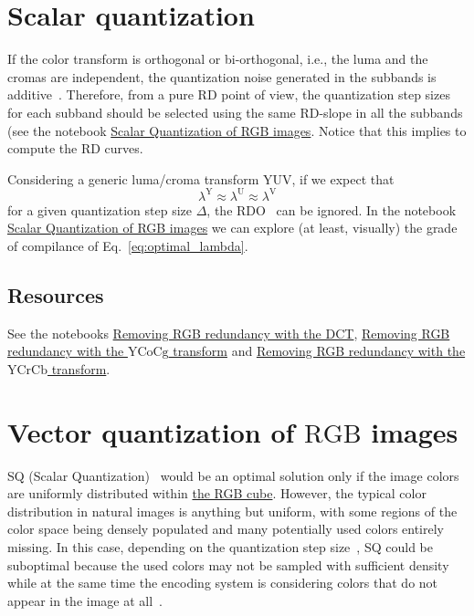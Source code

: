 \section{Scalar quantization}

If the color transform is orthogonal or bi-orthogonal, i.e., the luma
and the cromas are independent, the quantization noise generated in
the subbands is additive~\cite{burger2016digital}. Therefore, from a
pure RD point of view, the quantization step sizes for each subband
should be selected using the same RD-slope in all the subbands (see
the notebook
\href{https://github.com/vicente-gonzalez-ruiz/color_transforms/blob/main/docs/RGB/RGB_SQ.ipynb}{Scalar
  Quantization of RGB images}. Notice that this implies to compute the
RD curves.

Considering a generic luma/croma transform $\text{YUV}$, if we expect that
\begin{equation}
  \lambda^{\text{Y}} \approx \lambda^{\text{U}} \approx \lambda^{\text{V}}
  \label{eq:optimal_lambda}
\end{equation}
for a given quantization step size $\Delta$, the
RDO~\cite{vruiz__information_theory} can be ignored. In the notebook
\href{https://github.com/Sistemas-Multimedia/Sistemas-Multimedia.github.io/blob/master/contents/RGB_SQ/RGB_SQ.ipynb}{Scalar
  Quantization of RGB images} we can explore (at least, visually) the
grade of compilance of Eq.~\eqref{eq:optimal_lambda}.

\subsection*{Resources}
See the notebooks
\href{https://github.com/vicente-gonzalez-ruiz/color_transforms/blob/main/docs/3DCT/3DCT_over_RGB.ipynb}{Removing
  RGB redundancy with the DCT},
\href{https://github.com/vicente-gonzalez-ruiz/color_transforms/blob/main/docs/YCoCg/YCoCg_over_RGB.ipynb}{Removing
  RGB redundancy with the $\text{YCoCg}$ transform} and
\href{https://github.com/vicente-gonzalez-ruiz/color_transforms/blob/main/docs/YCrCb/YCrCb_over_RGB.ipynb}{Removing
  RGB redundancy with the $\text{YCrCb}$ transform}.

\section{Vector quantization of $\text{RGB}$ images}

SQ (Scalar
Quantization)~\cite{vruiz__scalar_quantization,sayood2017introduction}
would be an optimal solution only if the image colors are uniformly
distributed within
\href{https://en.wikipedia.org/wiki/RGB_color_model}{the RGB
  cube}. However, the typical color distribution in natural images is
anything but uniform, with some regions of the color space being
densely populated and many potentially used colors entirely
missing. In this case, depending on the quantization step
size~\cite{vruiz__signal_quantization}, SQ could be suboptimal because
the used colors may not be sampled with suﬃcient density while at the
same time the encoding system is considering colors that do not appear
in the image at all~\cite{burger2016digital}.

